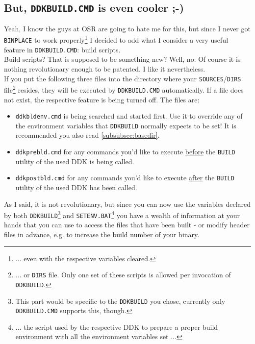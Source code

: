 \documentclass[a4paper,titlepage]{report}
\begin{document}
\subsection{But, \texttt{DDKBUILD.CMD} is even cooler \textsf{;-)}}
\label{subsec:buildscripts}
Yeah, I know the guys at OSR are going to hate me for this, but since I never got \texttt{BINPLACE}
to work properly\footnote{... even with the respective variables cleared.} I decided to
add what I consider a very useful feature in \texttt{DDKBUILD.CMD}: build scripts.\\

Build scripts? That is supposed to be something new? Well, no. Of course it is nothing
revolutionary enough to be patented. I like it nevertheless.\\If you put the
following three files into the directory where your \texttt{SOURCES}/\texttt{DIRS} file\footnote{... or
\texttt{DIRS} file. Only one set of these scripts is allowed per invocation of \texttt{DDKBUILD}.}
resides, they will be executed by \texttt{DDKBUILD.CMD} automatically.
If a file does not exist, the respective feature is being turned off. The files are:
\begin{itemize}
  \item \texttt{ddkbldenv.cmd} is being searched and started first. Use it to override any of the environment
  variables that \texttt{DDKBUILD} normally expects to be set! It is recommended you also read \autoref{subsubsec:basedir}.
  \item \texttt{ddkprebld.cmd} for any commands you'd like to execute \underline{before} the \texttt{BUILD}
  utility of the used DDK is being called.
  \item \texttt{ddkpostbld.cmd} for any commands you'd like to execute \underline{after} the \texttt{BUILD}
  utility of the used DDK has been called.
\end{itemize}

As I said, it is not revolutionary, but since you can now use the variables declared by both
\texttt{DDKBUILD}\footnote{This part would be specific to the \texttt{DDKBUILD} you chose,
currently only \texttt{DDKBUILD.CMD} supports this, though.} and \texttt{SETENV.BAT}\footnote{... the
script used by the respective DDK to prepare a proper build environment with all the
environment variables set ...} you have a wealth of information at your hands that
you can use to access the files that have been built - or modify header files in advance,
e.g. to increase the build number of your binary.
\end{document}

